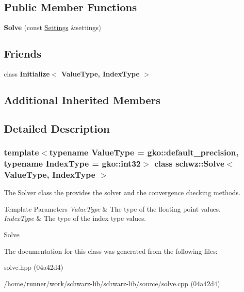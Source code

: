 \subsection*{Public Member Functions}
\begin{DoxyCompactItemize}
\item 
\mbox{\label{classschwz_1_1Solve_a24250987949518cc92649066d3ce147d}} 
{\bfseries Solve} (const \hyperlink{structschwz_1_1Settings}{Settings} \&settings)
\end{DoxyCompactItemize}
\subsection*{Friends}
\begin{DoxyCompactItemize}
\item 
\mbox{\label{classschwz_1_1Solve_a7044b349fe5363eeace2d1a56b38f650}} 
class {\bfseries Initialize$<$ Value\+Type, Index\+Type $>$}
\end{DoxyCompactItemize}
\subsection*{Additional Inherited Members}


\subsection{Detailed Description}
\subsubsection*{template$<$typename Value\+Type = gko\+::default\+\_\+precision, typename Index\+Type = gko\+::int32$>$\newline
class schwz\+::\+Solve$<$ Value\+Type, Index\+Type $>$}

The Solver class the provides the solver and the convergence checking methods. 


\begin{DoxyTemplParams}{Template Parameters}
{\em Value\+Type} & The type of the floating point values. \\
\hline
{\em Index\+Type} & The type of the index type values.\\
\hline
\end{DoxyTemplParams}
\hyperlink{group__solve}{Solve} 

The documentation for this class was generated from the following files\+:\begin{DoxyCompactItemize}
\item 
solve.\+hpp (04a42d4)\item 
/home/runner/work/schwarz-\/lib/schwarz-\/lib/source/solve.\+cpp (04a42d4)\end{DoxyCompactItemize}
